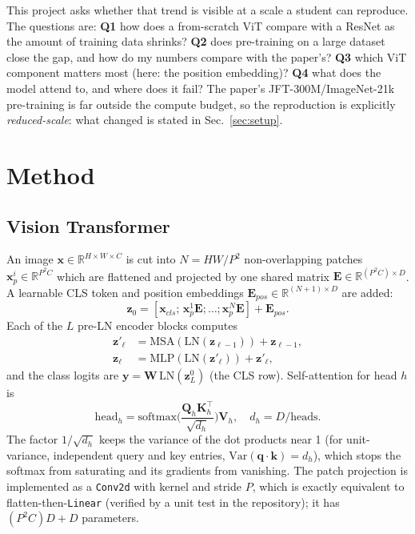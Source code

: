 \documentclass[conference]{IEEEtran}
\begin{document}
This project asks whether that trend is visible at a scale a student can reproduce. The questions are: \textbf{Q1} how does a from-scratch ViT compare with a ResNet as the amount of training data shrinks? \textbf{Q2} does pre-training on a large dataset close the gap, and how do my numbers compare with the paper's? \textbf{Q3} which ViT component matters most (here: the position embedding)? \textbf{Q4} what does the model attend to, and where does it fail? The paper's JFT-300M/ImageNet-21k pre-training is far outside the compute budget, so the reproduction is explicitly \emph{reduced-scale}: what changed is stated in Sec.~\ref{sec:setup}.

\section{Method}
\subsection{Vision Transformer}
An image $\mathbf{x}\in\mathbb{R}^{H\times W\times C}$ is cut into $N=HW/P^2$ non-overlapping patches $\mathbf{x}_p^i\in\mathbb{R}^{P^2C}$ which are flattened and projected by one shared matrix $\mathbf{E}\in\mathbb{R}^{(P^2C)\times D}$. A learnable CLS token and position embeddings $\mathbf{E}_{pos}\in\mathbb{R}^{(N+1)\times D}$ are added:
\begin{equation}
\mathbf{z}_0=[\mathbf{x}_{cls};\,\mathbf{x}_p^1\mathbf{E};\dots;\mathbf{x}_p^N\mathbf{E}]+\mathbf{E}_{pos}.
\end{equation}
Each of the $L$ pre-LN encoder blocks computes
\begin{align}
\mathbf{z}'_\ell&=\mathrm{MSA}(\mathrm{LN}(\mathbf{z}_{\ell-1}))+\mathbf{z}_{\ell-1},\\
\mathbf{z}_\ell&=\mathrm{MLP}(\mathrm{LN}(\mathbf{z}'_\ell))+\mathbf{z}'_\ell,
\end{align}
and the class logits are $\mathbf{y}=\mathbf{W}\,\mathrm{LN}(\mathbf{z}_L^{0})$ (the CLS row). Self-attention for head $h$ is
\begin{equation}
\mathrm{head}_h=\mathrm{softmax}\!\Big(\frac{\mathbf{Q}_h\mathbf{K}_h^{\top}}{\sqrt{d_h}}\Big)\mathbf{V}_h,\quad d_h=D/\text{heads}.
\label{eq:attn}
\end{equation}
The factor $1/\sqrt{d_h}$ keeps the variance of the dot products near 1 (for unit-variance, independent query and key entries, $\mathrm{Var}(\mathbf{q}\!\cdot\!\mathbf{k})=d_h$), which stops the softmax from saturating and its gradients from vanishing. The patch projection is implemented as a \texttt{Conv2d} with kernel and stride $P$, which is exactly equivalent to flatten-then-\texttt{Linear} (verified by a unit test in the repository); it has $(P^2C)D+D$ parameters.
\end{document}
